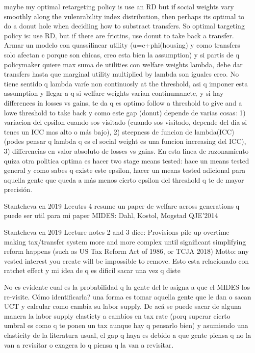 \documentclass[12pt]{article}
\begin{document}
maybe my optimal retargeting policy is use an RD but if social weights vary smoothly along the vulenrability index distribution, then perhaps its optimal to do a donut hole when decidiing how to substract transfers. So optimal targeting policy is: use RD, but if there are frictins, use donut to take back a transfer. Armar un modelo con quassilinear utility (u=c+phi(housing) y como transfers solo afectan c porque son chicas, creo esta bien la assumption) y si partis de q policymaker quiere max suma de utilities con welfare weights lambda, debe dar transfers hasta que marginal utility multiplied by lambda son iguales creo. No tiene sentido q lambda varíe non continuosly at the threshold, asi q imponer esta assumption y llegar a q si welfare weights varian continumanete, y si hay differences in losses vs gains, te da q es optimo follow a threshold to give and a lowe threshold to take back y como este gap (donut) depende de varias cosas: 1) variacion del epsilon cuando sos visitado (cuando sos visitado, depende del dia si tenes un ICC mas alto o más bajo), 2) steepness de funcion de lambda(ICC) (podes pensar q lambda q es el social weight es una funcion increasing del ICC), 3) differencias en valor absoluto de losses vs gains. En esta linea de razonamiento quiza otra politica optima es hacer two stage means tested: hace un means tested general y como sabes q existe este epsilon, hacer un means tested adicional para aquella gente que queda a más menos cierto epsilon del threshold q te de mayor precisión.

Stantcheva en 2019 Lecutrs 4 resume un paper de welfare across generations q puede ser util para mi paper MIDES: Dahl, Kostol, Mogstad QJE’2014

Stantcheva en 2019 Lecture notes 2 and 3 dice: Provisions pile up overtime making tax/transfer system more and more complex until significant simplifying reform happens (such as US Tax Reform Act of 1986, or TCJA 2018)
Motto: any vested interest you create will be impossible to remove. Esto esta relacionado con ratchet effect y mi idea de q es dificil sacar una vez q diste

No es evidente cual es la probabilidad q la gente del le asigna a que el MIDES los re-visite. Cómo identificarla? una forma es tomar aquella gente que le dan o sacan UCT y calcular como cambia su labor supply. De acá se puede sacar de alguna manera la labor supply elasticty a cambios en tax rate (porq superar cierto umbral es como q te ponen un tax aunque hay q pensarlo bien) y asumiendo una elasticity de la literatura usual, el gap q haya es debido a que gente piensa q no la van a revisitar o exagera lo q piensa q la van a revisitar.
\end{document}
